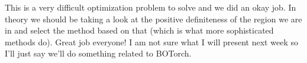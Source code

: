 \documentclass[12pt]{article}
\begin{document}
\vspace{5mm}

This is a very difficult optimization problem to solve and we did an okay job. In theory we should be taking a look at the positive definiteness of the region we are in and select the method based on that (which is what more sophisticated methods do). Great job everyone! I am not sure what I will present next week so I'll just say we'll do something related to BOTorch.
\end{document}
